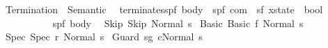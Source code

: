 %
\begin{isabellebody}%
%
%
\isamarkuptrue%
%
\isadelimtheory
%
\endisadelimtheory
%
\isatagtheory
{}\isamarkupfalse%
\ Termination\ \ Semantic\ %
\endisatagtheory
{\isafoldtheory}%
%
\isadelimtheory
%
\endisadelimtheory
%
\isamarkuptrue%
\isamarkupfalse%
\ {\isachardoublequoteopen}terminates{\isachardoublequoteclose}{\isacharcolon}{\isacharcolon}{\isachardoublequoteopen}{\isacharparenleft}{\isacharprime}s{\isacharcomma}{\isacharprime}p{\isacharcomma}{\isacharprime}f{\isacharparenright}\ body\ {\isasymRightarrow}\ {\isacharparenleft}{\isacharprime}s{\isacharcomma}{\isacharprime}p{\isacharcomma}{\isacharprime}f{\isacharparenright}\ com\ {\isasymRightarrow}\ {\isacharparenleft}{\isacharprime}s{\isacharcomma}{\isacharprime}f{\isacharparenright}\ xstate\ {\isasymRightarrow}\ bool{\isachardoublequoteclose}\isanewline
\ \ {\isacharparenleft}{\isachardoublequoteopen}{\isacharunderscore}{\isasymturnstile}{\isacharunderscore}\ {\isasymdown}\ {\isacharunderscore}{\isachardoublequoteclose}\ {\isacharbrackleft}{}{}{\isacharcomma}{}{}{\isacharcomma}{}{}{\isacharbrackright}\ {}{}{\isacharparenright}\isanewline
\ \ \ \ {\isasymGamma}{\isacharcolon}{\isacharcolon}{\isachardoublequoteopen}{\isacharparenleft}{\isacharprime}s{\isacharcomma}{\isacharprime}p{\isacharcomma}{\isacharprime}f{\isacharparenright}\ body{\isachardoublequoteclose}\isanewline
{}\isanewline
\ \ Skip{\isacharcolon}\ {\isachardoublequoteopen}{\isasymGamma}{\isasymturnstile}Skip\ {\isasymdown}{\isacharparenleft}Normal\ s{\isacharparenright}{\isachardoublequoteclose}\isanewline
\isanewline
{\isacharbar}\ Basic{\isacharcolon}\ {\isachardoublequoteopen}{\isasymGamma}{\isasymturnstile}Basic\ f\ {\isasymdown}{\isacharparenleft}Normal\ s{\isacharparenright}{\isachardoublequoteclose}\isanewline
\isanewline
{\isacharbar}\ Spec{\isacharcolon}\ {\isachardoublequoteopen}{\isasymGamma}{\isasymturnstile}Spec\ r\ {\isasymdown}{\isacharparenleft}Normal\ s{\isacharparenright}{\isachardoublequoteclose}\isanewline
\isanewline
{\isacharbar}\ Guard{\isacharcolon}\ {\isachardoublequoteopen}{\isasymlbrakk}s{\isasymin}g{\isacharsemicolon}\ {\isasymGamma}{\isasymturnstile}c{\isasymdown}{\isacharparenleft}Normal\ s{\isacharparenright}{\isasymrbrakk}\ \isanewline

\end{isabellebody}
